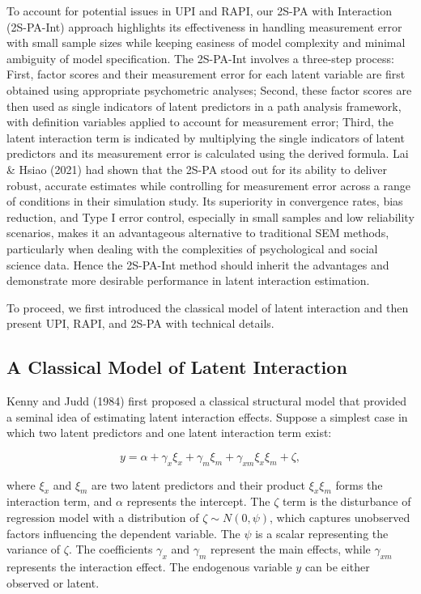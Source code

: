 \documentclass[
  man]{apa7}
\begin{document}
To account for potential issues in UPI and RAPI, our 2S-PA with Interaction (2S-PA-Int) approach highlights its effectiveness in handling measurement error with small sample sizes while keeping easiness of model complexity and minimal ambiguity of model specification. The 2S-PA-Int involves a three-step process: First, factor scores and their measurement error for each latent variable are first obtained using appropriate psychometric analyses; Second, these factor scores are then used as single indicators of latent predictors in a path analysis framework, with definition variables applied to account for measurement error; Third, the latent interaction term is indicated by multiplying the single indicators of latent predictors and its measurement error is calculated using the derived formula. Lai \& Hsiao (2021) had shown that the 2S-PA stood out for its ability to deliver robust, accurate estimates while controlling for measurement error across a range of conditions in their simulation study. Its superiority in convergence rates, bias reduction, and Type I error control, especially in small samples and low reliability scenarios, makes it an advantageous alternative to traditional SEM methods, particularly when dealing with the complexities of psychological and social science data. Hence the 2S-PA-Int method should inherit the advantages and demonstrate more desirable performance in latent interaction estimation.

To proceed, we first introduced the classical model of latent interaction and then present UPI, RAPI, and 2S-PA with technical details.

\hypertarget{a-classical-model-of-latent-interaction}{%
\subsection{A Classical Model of Latent Interaction}\label{a-classical-model-of-latent-interaction}}

Kenny and Judd (1984) first proposed a classical structural model that provided a seminal idea of estimating latent interaction effects. Suppose a simplest case in which two latent predictors and one latent interaction term exist:

\begin{equation}
y = \alpha + \gamma_{x}\xi_{x} + \gamma_{m}\xi_{m} + \gamma_{xm}\xi_{x}\xi_{m} + \zeta,
\end{equation}

where \(\xi_{x}\) and \(\xi_{m}\) are two latent predictors and their product \(\xi_{x}\xi_{m}\) forms the interaction term, and \(\alpha\) represents the intercept. The \(\zeta\) term is the disturbance of regression model with a distribution of \(\zeta \sim N(0, \psi)\), which captures unobserved factors influencing the dependent variable. The \(\psi\) is a scalar representing the variance of \(\zeta\). The coefficients \(\gamma_{x}\) and \(\gamma_{m}\) represent the main effects, while \(\gamma_{xm}\) represents the interaction effect. The endogenous variable \(y\) can be either observed or latent.
\end{document}
